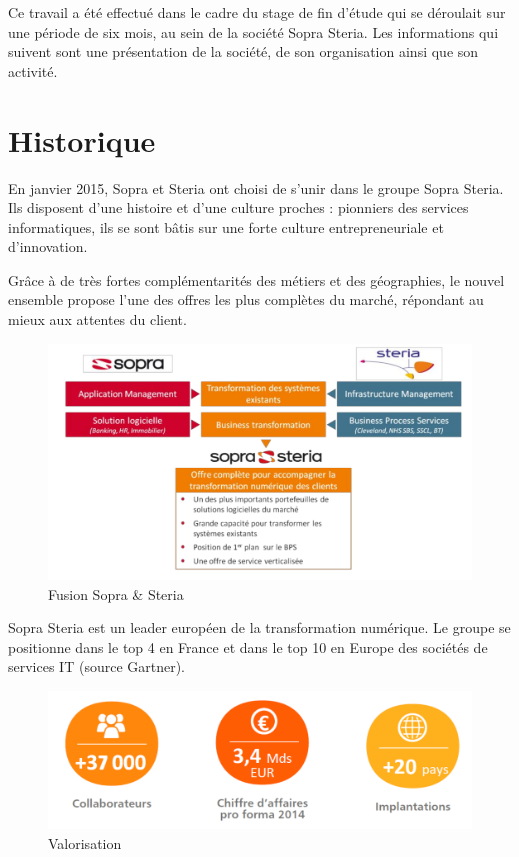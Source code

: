 \documentclass[a4paper]{memoir}
\begin{document}
Ce travail a été effectué dans le cadre du stage de fin d'étude qui se déroulait sur une période de six mois, au sein de la société Sopra Steria.
Les informations qui suivent sont une présentation de la société, de son organisation ainsi que son activité.

\section*{Historique}

En janvier 2015, Sopra et Steria ont choisi de s’unir dans le groupe Sopra Steria. Ils disposent d’une histoire et d’une culture proches : pionniers des services informatiques, ils se sont bâtis sur une forte culture entrepreneuriale et d’innovation.

Grâce à de très fortes complémentarités des métiers et des géographies, le nouvel ensemble propose l’une des offres les plus complètes du marché, répondant au mieux aux attentes du client. 

\begin{figure}[!ht]
    \center
    \includegraphics[width=1\textwidth]{./images/sopra1.png}
    \caption{Fusion Sopra \& Steria}
    \label{Sopra+Steria}
\end{figure}

Sopra Steria est un leader européen de la transformation numérique. Le groupe se positionne dans le top 4
en France et dans le top 10 en Europe des sociétés de services IT (source Gartner).

\begin{figure}[!ht]
    \center
    \includegraphics[width=1\textwidth]{./images/sopra2.png}
    \caption{Valorisation}
    \label{Sopra+Steria+chiffre}
\end{figure}
\end{document}
